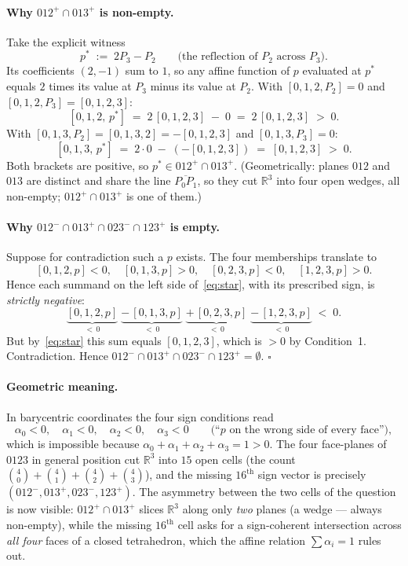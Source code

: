 \documentclass[11pt]{article}
\begin{document}
\paragraph{Why \texorpdfstring{$012^+ \cap 013^+$}{012+ cap 013+} is non-empty.}
Take the explicit witness
\[
p^\ast \;:=\; 2 P_3 - P_2 \qquad \text{(the reflection of } P_2 \text{ across } P_3\text{).}
\]
Its coefficients $(2, -1)$ sum to $1$, so any affine function of $p$ evaluated at
$p^\ast$ equals $2$ times its value at $P_3$ minus its value at $P_2$. With
$[0,1,2,P_2]=0$ and $[0,1,2,P_3]=[0,1,2,3]$:
\[
[0,1,2,\,p^\ast] \;=\; 2\,[0,1,2,3] \;-\; 0 \;=\; 2\,[0,1,2,3] \;>\; 0.
\]
With $[0,1,3,P_2]=[0,1,3,2]=-[0,1,2,3]$ and $[0,1,3,P_3]=0$:
\[
[0,1,3,\,p^\ast] \;=\; 2\cdot 0 \;-\; (-[0,1,2,3]) \;=\; [0,1,2,3] \;>\; 0.
\]
Both brackets are positive, so $p^\ast \in 012^+ \cap 013^+$. (Geometrically:
planes $012$ and $013$ are distinct and share the line $\overline{P_0 P_1}$, so
they cut $\mathbb{R}^3$ into four open wedges, all non-empty; $012^+\cap 013^+$
is one of them.)

\paragraph{Why \texorpdfstring{$012^- \cap 013^+ \cap 023^- \cap 123^+$}{012- cap 013+ cap 023- cap 123+} is empty.}
Suppose for contradiction such a $p$ exists. The four memberships translate to
\[
[0,1,2,p] < 0,\quad [0,1,3,p] > 0,\quad [0,2,3,p] < 0,\quad [1,2,3,p] > 0.
\]
Hence each summand on the left side of~\eqref{eq:star}, with its prescribed sign,
is \emph{strictly negative}:
\[
\underbrace{[0,1,2,p]}_{<\,0}
\;\underbrace{-\,[0,1,3,p]}_{<\,0}
\;\underbrace{+\,[0,2,3,p]}_{<\,0}
\;\underbrace{-\,[1,2,3,p]}_{<\,0}
\;<\; 0.
\]
But by~\eqref{eq:star} this sum equals $[0,1,2,3]$, which is $>0$ by Condition~1.
Contradiction. Hence $012^- \cap 013^+ \cap 023^- \cap 123^+ = \emptyset$.
\hfill$\square$

\paragraph{Geometric meaning.} In barycentric coordinates the four sign
conditions read
\[
\alpha_0 < 0,\quad \alpha_1 < 0,\quad \alpha_2 < 0,\quad \alpha_3 < 0
\qquad\text{(``$p$ on the wrong side of every face'')},
\]
which is impossible because $\alpha_0+\alpha_1+\alpha_2+\alpha_3 = 1 > 0$. The
four face-planes of $0123$ in general position cut $\mathbb{R}^3$ into $15$ open
cells (the count $\binom{4}{0}+\binom{4}{1}+\binom{4}{2}+\binom{4}{3}$), and the
missing $16^{\mathrm{th}}$ sign vector is precisely $(012^-, 013^+, 023^-, 123^+)$.
The asymmetry between the two cells of the question is now visible: $012^+\cap 013^+$
slices $\mathbb{R}^3$ along only \emph{two} planes (a wedge --- always non-empty),
while the missing $16^{\mathrm{th}}$ cell asks for a sign-coherent intersection
across \emph{all four} faces of a closed tetrahedron, which the affine relation
$\sum\alpha_i = 1$ rules out.
\end{document}
